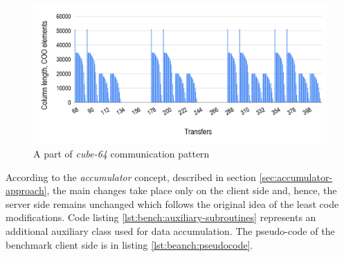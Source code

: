\begin{figure}[htpb]
  \centering
  \includegraphics[width=1.0\textwidth]{figures/chapter-3/communication-pattern.png}
  \caption{A part of \textit{cube-64} communication pattern} \label{fig:communication-pattern}
\end{figure}


According to the \textit{accumulator} concept, described in section \ref{sec:accumulator-approach}, the main changes take place only on the client side and, hence, the server side remains unchanged which follows the original idea of the least code modifications. Code listing \ref{lst:bench:auxiliary-subroutines} represents an additional auxiliary class used for data accumulation. The pseudo-code of the benchmark client side is in listing \ref{lst:beanch:pseudocode}.\\ 


